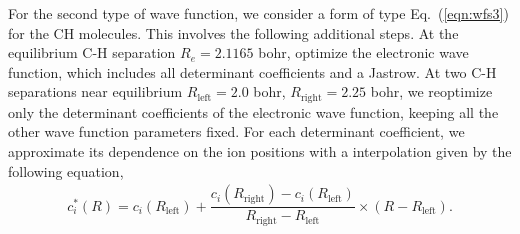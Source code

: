\documentclass[aip,jcp,numerical,reprint]{revtex4-1}
\begin{document}
For the second type of wave function, we consider a form of type Eq.~(\ref{eqn:wfs3}) for the CH molecules.  This involves the following additional steps. At the equilibrium C-H separation $R_e=2.1165$ bohr, optimize the electronic wave function, which includes all determinant coefficients and a Jastrow. At two C-H separations near equilibrium $R_{\text{left}}=2.0$ bohr, $R_{\text{right}}=2.25$ bohr, we reoptimize only the determinant coefficients of the electronic wave function, keeping all the other wave function parameters fixed. For each determinant coefficient, we approximate its dependence on the ion positions with a interpolation given by the following equation,
\begin{align}
c_i^*(R) = c_i(R_{\text{left}}) + 
\dfrac{c_i(R_{\text{right}}) - c_i(R_{\text{left}})}{R_{\text{right}}-R_{\text{left}}}\times(R-R_{\text{left}}). \label{eq:interpolation}
\end{align}

\end{document}
